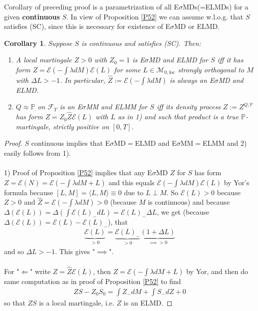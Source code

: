 \documentclass[12pt,a4paper, twoside]{article}
\newtheorem{cor}{Corollary}[section]
\theoremstyle{definition}
\newcommand{\PP}{\mathbb{P}} %
\begin{document}
\newpage
Corollary of preceding proof is a parametrization of all E$\sigma$MDs(=ELMDs) for a given \textbf{continuous} $S$. In view of Proposition \ref{P52} we can assume w.l.o.g. that $S$ satisfies (SC), since this is necessary for existence of E$\sigma$MD or ELMD. 
\begin{cor}\label{C53} Suppose $S$ is continuous and satisfies (SC). Then:
\begin{enumerate}
\item A local martingale $Z >0$ with $Z_0=1$ is E$\sigma$MD and ELMD for $S$ iff it has form $Z = \mathcal{E}(- \int \lambda d M) \mathcal{E}(L)$ for some $L \in \mathcal{M}_{0, \text{loc}}$ strongly orthogonal to $M$ with $\Delta L > -1$. In particular, $\hat{Z}:= \mathcal{E}(- \int \lambda dM)$ is always an E$\sigma$MD and ELMD. 
\item $Q \approx \PP$ on $\mathcal{F}_T$ is an E$\sigma$MM and ELMM for $S$ iff its density process $Z:= Z^{Q;  \PP}$ has form $Z = Z_0 \hat{Z} \mathcal{E}(L)$ with $L$ as in 1) and such that product is a true $\PP$-martingale, strictly positive on $[0,T]$. 
\end{enumerate}
\end{cor}
\begin{proof}
$S$ continuous implies that E$\sigma$MD$=$ELMD and E$\sigma$MM$=$ELMM and 2) easily follows from 1).
\\\\
1) Proof of Proposition \ref{P52} implies that any E$\sigma$MD $Z$ for $S$ has form $Z = \mathcal{E}(N)= \mathcal{E}(- \int \lambda dM +L )$ and this equals $\mathcal{E}( - \int \lambda dM) \mathcal{E}(L)$ by Yor's formula because $[L,M]= \langle L,M \rangle \equiv 0$ due to $L \perp M$. So $\mathcal{E}(L) >0$ because $Z>0$ and $\hat{Z} = \mathcal{E}(- \int \lambda dM) >0$ (because $M$ is continuous) and because $\Delta ( \mathcal{E}(L))= \Delta ( \int \mathcal{E}(L)_-dL) = \mathcal{E}(L)_- \Delta L$, we get (because $\Delta( \mathcal{E}(L))= \mathcal{E}(L)-\mathcal{E}(L)_-$), that
\begin{align*}
\underbrace{\mathcal{E}(L)}_{>0} = \underbrace{\mathcal{E}(L)_-}_{>0} \underbrace{(1 + \Delta L)}_{\implies >0}
\end{align*}
and so $\Delta L >-1$. This gives "$\implies$". 
\\\\
For "$\Longleftarrow$" write $Z= \hat{Z} \mathcal{E}(L)$, then $Z = \mathcal{E}(- \int \lambda dM + L)$ by Yor, and then do same computation as in proof of Proposition \ref{P52} to find 
\begin{align*}
ZS-Z_0S_0 = \int Z_-dM + \int S_- dZ + 0
\end{align*}
so that $ZS$ is a local martingale, i.e. $Z$ is an ELMD. 
\end{proof}
\end{document}
